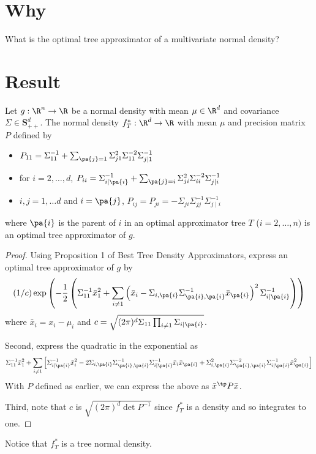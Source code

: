 

\section*{Why}

What is the optimal tree approximator of a multivariate normal density?

\section*{Result}



\begin{proposition}
Let $g: \R ^n \to \R $ be a normal density with mean $\mu \in \R ^d$ and covariance $\Sigma  \in \mathbf{S} ^d_{++}$.
The normal density $f^*_T: \R ^d \to \R $ with mean $\mu $ and precision matrix $P$ defined by
    \begin{itemize}
      \item $P_{11} = \Sigma _{11}^{-1} + \sum_{\pa{j} = 1} \Sigma _{j1}^2\Sigma _{11}^{-2}\Sigma _{j\mid 1}^{-1}$
      \item for $i = 2, \dots , d$, $P_{ii} = \Sigma _{i\mid\pa{i}}^{-1} + \sum_{\pa{j} = i} \Sigma _{ji}^2\Sigma _{ii}^{-2}\Sigma _{j\mid i}^{-1}$
      \item $i, j = 1, \dots  d$ and $i = \pa{j}$, $P_{ij} = P_{ji} = -\Sigma _{ji}\Sigma _{jj}^{-1}\Sigma _{j \mid i}^{-1}$
    \end{itemize}
where $\pa{i}$ is the parent of $i$ in an optimal approximator tree $T$ ($i = 2, \dots , n)$ is an optimal tree approximator of $g$.
\end{proposition}
\begin{proof}Using Proposition 1 of Best Tree Density Approximators, express an optimal tree approximator of $g$ by
    \[
(1/c)
\exp\left(
-\frac{1}{2}
\left(
\Sigma _{11}^{-1}\bar{x}_1^2 +
\sum_{i \neq 1}
\left(\bar{x}_i - \Sigma _{i,\pa{i}}\Sigma _{\pa{i},\pa{i}}^{-1}\bar{x}_{\pa{i}}\right)^2\Sigma _{i\mid\pa{i}}^{-1}
\right)
\right)
    \]
where $\bar{x}_i = x_i - \mu _i$ and $c = \sqrt{(2\pi )^d\Sigma _{11} \prod_{i \neq 1} \Sigma _{i \mid \pa{i}}}$.

Second, express the quadratic in the exponential as
    \[
\Sigma _{11}^{-1}\bar{x}_1^2 +
\sum_{i \neq 1}
\left[
\Sigma _{i\mid\pa{i}}^{-1}
\bar{x}_i^2
-
2
\Sigma _{i,\pa{i}}\Sigma _{\pa{i},\pa{i}}^{-1}\Sigma _{i\mid\pa{i}}^{-1}
\bar{x}_i\bar{x}_{\pa{i}}
+
\Sigma _{i,\pa{i}}^2\Sigma _{\pa{i},\pa{i}}^{-2}\Sigma _{i\mid\pa{i}}^{-1}
\bar{x}_{\pa{i}}^2
\right]
    \]
With $P$ defined as earlier, we can express the above as $\bar{x}^{\tp} P \bar{x}$.



Third, note that $c$ is $\sqrt{(2\pi )^d\det P^{-1}}$ since $f^*_T$ is a density and so integrates to one.
\end{proof}
Notice that $f^*_T$ is a tree normal density.

